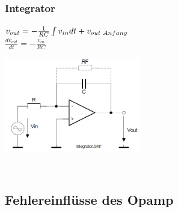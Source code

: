 		\subsubsection{Integrator } 
		\vspace{1cm}
		\begin{minipage}[b]{12cm}
		$v_{out}=-\frac{1}{RC} \int{v_{in}}dt +
		v_{out\hspace{1mm}Anfang} $\\
		$\frac{dv_{out}}{dt}=-\frac{v_{in}}{RC}$\\
		\end{minipage} 
		\begin{minipage}{6cm}
          	\includegraphics[width=6cm]{./bilder/integrator.png} 
        \end{minipage}\\

		\subsection{Fehlereinflüsse des Opamp }
